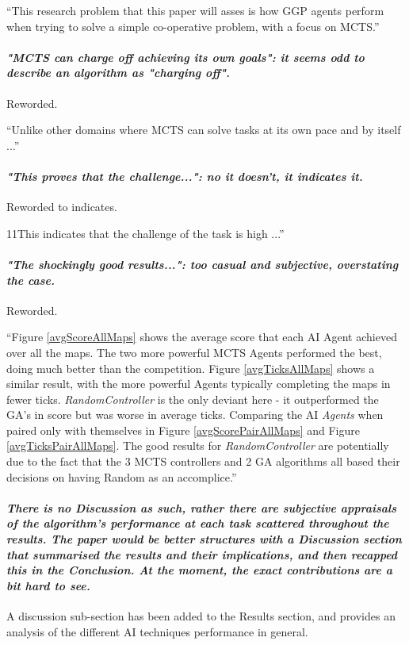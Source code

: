 \documentclass{article}
\begin{document}
``This research problem that this paper will asses is how GGP agents perform when trying to solve a simple co-operative problem, with a focus on MCTS.''
\paragraph*{\textit{"MCTS can charge off achieving its own goals": it seems odd to describe an algorithm as "charging off".}}
Reworded.

``Unlike other domains where MCTS can solve tasks at its own pace and by itself ...''
\paragraph*{\textit{"This proves that the challenge...": no it doesn't, it indicates it.}}
Reworded to indicates.

11This indicates that the challenge of the task is high ...''
\paragraph*{\textit{"The shockingly good results...": too casual and subjective, overstating the case.}}
Reworded.

``Figure \ref{avgScoreAllMaps} shows the average score that each AI Agent achieved over all the maps. The two more powerful MCTS Agents performed the best, doing much better than the competition. Figure \ref{avgTicksAllMaps} shows a similar result, with the more powerful Agents typically completing the maps in fewer ticks. \emph{RandomController} is the only deviant here - it outperformed the GA's in score but was worse in average ticks. Comparing the AI \emph{Agents} when paired only with themselves in Figure \ref{avgScorePairAllMaps} and Figure \ref{avgTicksPairAllMaps}. The good results for \emph{RandomController} are potentially due to the fact that the 3 MCTS controllers and 2 GA algorithms all based their decisions on having Random as an accomplice.''

\paragraph*{\textit{There is no Discussion as such, rather there are subjective appraisals of the algorithm's performance at each task scattered throughout the results. The paper would be better structures with a Discussion section that summarised the results and their implications, and then recapped this in the Conclusion. At the moment, the exact contributions are a bit hard to see.}}
A discussion sub-section has been added to the Results section, and provides an analysis of the different AI techniques performance in general.
\end{document}
